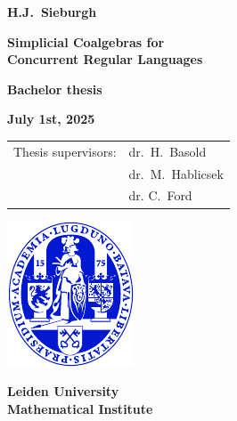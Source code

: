 \pagestyle{empty}

\vspace*{1em}

\begin{center}

{\Large\bf 
H.J.\ Sieburgh
} 

\vspace{1em} 

{\LARGE\bf 
Simplicial Coalgebras for
\\ \vspace{.25em} 
Concurrent Regular Languages
} 

\vspace{10em} 

{\large\bf 
Bachelor thesis
} 

\vspace{1em}

{\large\bf 
July 1st, 2025
}

\vspace{8em} 

{\large\bf
\begin{tabular}{ll}
Thesis supervisors: & dr.\ H.\ Basold\\
                            & dr.\ M.\ Hablicsek\\
                            & dr. C.\ Ford\\
\end{tabular}
}

\vfill

\includegraphics[width = 0.2\linewidth]{ulzegel_blauw.pdf}\\

\vspace{2em}

{\large\bf 
Leiden University\\
Mathematical Institute\\
}

\end{center} \newpage